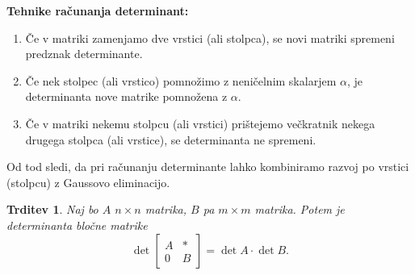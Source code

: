 \documentclass[10pt, a4paper]{article}
\newtheorem{trditev}[izr]{Trditev}
\begin{document}
\textbf{Tehnike računanja determinant:}
\begin{enumerate}
    \item Če v matriki zamenjamo dve vrstici (ali stolpca), se novi matriki spremeni predznak determinante.
    \item Če nek stolpec (ali vrstico) pomnožimo z neničelnim skalarjem $\alpha$, je determinanta nove matrike pomnožena z $\alpha$.
    \item Če v matriki nekemu stolpcu (ali vrstici) prištejemo večkratnik nekega drugega stolpca (ali vrstice), se determinanta ne spremeni. 
\end{enumerate}
Od tod sledi, da pri računanju determinante lahko kombiniramo razvoj po vrstici (stolpcu) z Gaussovo eliminacijo.

\begin{trditev}
    Naj bo $A$ $n \times n$ matrika, $B$ pa $m \times m$ matrika.
    Potem je determinanta bločne matrike
    $$\det \begin{bmatrix}
        A & *\\
        0 & B
    \end{bmatrix} = \det A \cdot \det B.$$
\end{trditev}
\end{document}
